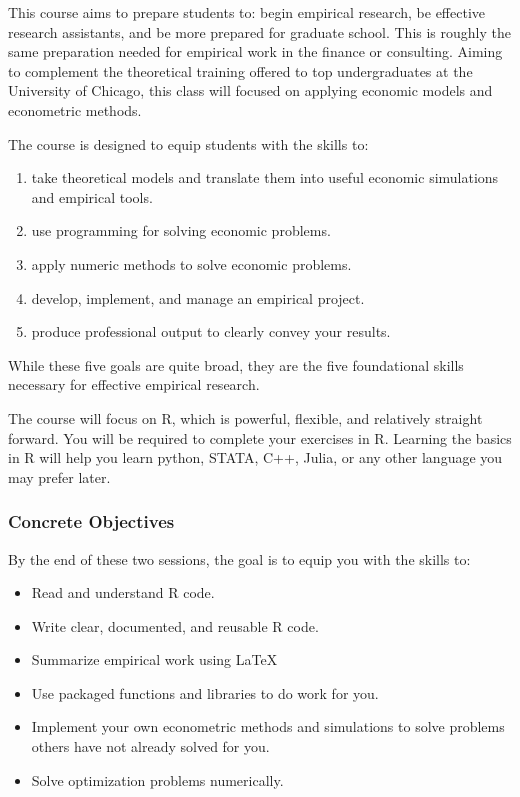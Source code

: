 \documentclass{scrartcl}
\begin{document}
This course aims to prepare students to: begin empirical research, be effective research assistants, and be more prepared for graduate school. This is roughly the same preparation needed for empirical work in the finance or consulting. Aiming to complement the theoretical training offered to top undergraduates at the University of Chicago, this class will focused on applying economic models and econometric methods. 

\pagebreak

The course is designed to equip students with the skills to:
\begin{enumerate}
\item take theoretical models and translate them into useful economic simulations and empirical tools.
\item use programming for solving economic problems.
\item apply numeric methods to solve economic problems.
\item develop, implement, and manage an empirical project.
\item produce professional output to clearly convey your results.
\end{enumerate}
While these five goals are quite broad, they are the five foundational skills necessary for effective empirical research. 

The course will focus on R, which is powerful, flexible, and relatively straight forward. You will be required to complete your exercises in R. Learning the basics in R will help you learn python, STATA, C++, Julia, or any other language you may prefer later.

\subsubsection*{Concrete Objectives}



By the end of these two sessions, the goal is to equip you with the skills to:
\begin{itemize}
\item Read and understand R code.
\item Write clear, documented, and reusable R code.
\item Summarize empirical work using \LaTeX
\item Use packaged functions and libraries to do work for you.
\item Implement your own econometric methods and simulations to solve problems others have not already solved for you.
\item Solve optimization problems numerically. 
\end{itemize}
\end{document}
